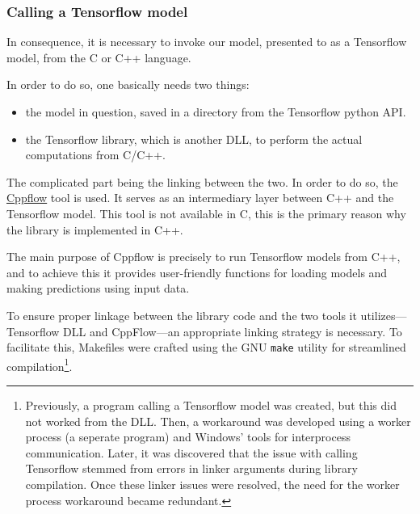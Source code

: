 

\subsubsection{Calling a Tensorflow model}

In consequence, it is necessary to invoke our model, presented to as a Tensorflow model, from the C or C++ language.

In order to do so, one basically needs two things:
\begin{itemize}
    \item the model in question, saved in a directory from the Tensorflow python API.
    \item the Tensorflow library, which is another DLL, to perform the actual computations from C/C++.
\end{itemize}

The complicated part being the linking between the two. In order to do so, the \href{https://serizba.github.io/cppflow/}{Cppflow} tool is used. It serves as an intermediary layer between C++ and the Tensorflow model. This tool is not available in C, this is the primary reason why the library is implemented in C++.

The main purpose of Cppflow is precisely to run Tensorflow models from C++, and to achieve this it provides user-friendly functions for loading models and making predictions using input data.

To ensure proper linkage between the library code and the two tools it utilizes—Tensorflow DLL and CppFlow—an appropriate linking strategy is necessary. To facilitate this, Makefiles were crafted using the GNU \texttt{make} utility for streamlined compilation\footnote{Previously, a program calling a Tensorflow model was created, but this did not worked from the DLL. Then, a workaround was developed using a worker process (a seperate program) and Windows' tools for interprocess communication. Later, it was discovered that the issue with calling Tensorflow stemmed from errors in linker arguments during library compilation. Once these linker issues were resolved, the need for the worker process workaround became redundant.}.


